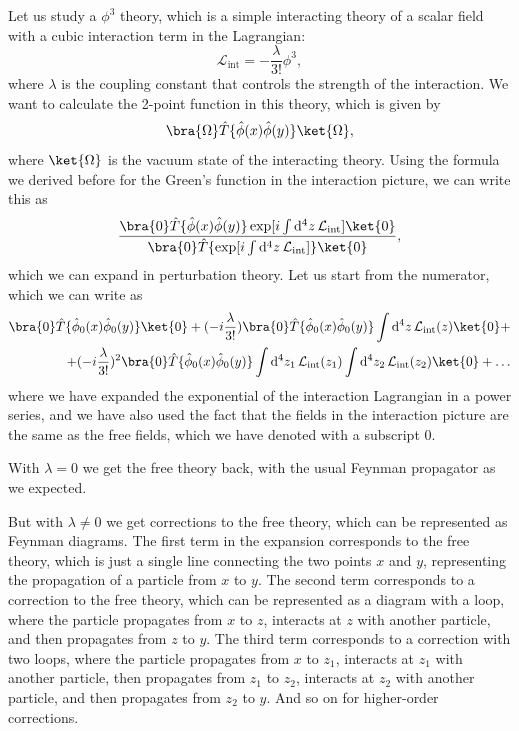 \begin{example}
    Let us study a \(\phi^3\) theory, which is a simple interacting theory of a scalar field with a cubic interaction term in the Lagrangian:
    \[
        \mathcal{L}_{\text{int}} = - \frac{\lambda}{3!} \phi^3,
    \]
    where \(\lambda\) is the coupling constant that controls the strength of the interaction. We want to calculate the 2-point function in this theory, which is given by
    \[
        \bra{\Omega} \hat{T} \{ \hat{\phi} (x) \hat{\phi} (y) \} \ket{\Omega},
    \]
    where \(\ket{\Omega}\) is the vacuum state of the interacting theory. Using the formula we derived before for the Green's function in the interaction picture, we can write this as
    \[
        \frac{\bra{0} \hat{T} \{ \hat{\phi} (x) \hat{\phi} (y) \} \exp[ i \int \mathrm{d}^4 z \, \mathcal{L}_{\text{int}} ] \ket{0}}{\bra{0} \hat{T} \{ \exp[ i \int \mathrm{d}^4 z \, \mathcal{L}_{\text{int}} ] \} \ket{0}},
    \]
    which we can expand in perturbation theory. Let us start from the numerator, which we can write as
    \[
        \begin{aligned}
            \bra{0} \hat{T} \{ \hat{\phi}_0 (x) \hat{\phi}_0 (y) \} \ket{0} + (-i \frac{\lambda}{3!}) \bra{0} \hat{T} \{ \hat{\phi}_0 (x) \hat{\phi}_0 (y) \} \int \mathrm{d}^4 z \, \mathcal{L}_{\text{int}} (z) \ket{0} + \\
            + (-i \frac{\lambda}{3!})^2 \bra{0} \hat{T} \{ \hat{\phi}_0 (x) \hat{\phi}_0 (y) \} \int \mathrm{d}^4 z_1 \, \mathcal{L}_{\text{int}} (z_1) \int \mathrm{d}^4 z_2 \, \mathcal{L}_{\text{int}} (z_2) \ket{0} + \dots
        \end{aligned}
    \]
    where we have expanded the exponential of the interaction Lagrangian in a power series, and we have also used the fact that the fields in the interaction picture are the same as the free fields, which we have denoted with a subscript \(0\).

    With \(\lambda=0\) we get the free theory back, with the usual Feynman propagator as we expected.

    But with \(\lambda \neq 0\) we get corrections to the free theory, which can be represented as Feynman diagrams. The first term in the expansion corresponds to the free theory, which is just a single line connecting the two points \(x\) and \(y\), representing the propagation of a particle from \(x\) to \(y\). The second term corresponds to a correction to the free theory, which can be represented as a diagram with a loop, where the particle propagates from \(x\) to \(z\), interacts at \(z\) with another particle, and then propagates from \(z\) to \(y\). The third term corresponds to a correction with two loops, where the particle propagates from \(x\) to \(z_1\), interacts at \(z_1\) with another particle, then propagates from \(z_1\) to \(z_2\), interacts at \(z_2\) with another particle, and then propagates from \(z_2\) to \(y\). And so on for higher-order corrections.


\end{example}
